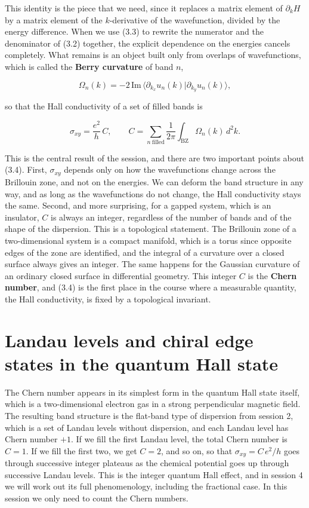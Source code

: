 This identity is the piece that we need, since it replaces a matrix element of $\partial_k H$ by a
matrix element of the $k$-derivative of the wavefunction, divided by the energy difference. When we
use (3.3) to rewrite the numerator and the denominator of (3.2) together, the explicit dependence on
the energies cancels completely. What remains is an object built only from overlaps of wavefunctions,
which is called the \textbf{Berry curvature} of band $n$,

\begin{equation*}
\Omega_n(k) = -2\,\mathrm{Im}\, \langle \partial_{k_x} u_n(k)|\partial_{k_y} u_n(k)\rangle,
\end{equation*}

so that the Hall conductivity of a set of filled bands is

\begin{equation}
\sigma_{xy} = \frac{e^2}{h}\, C, \qquad
C = \sum_{n\ \text{filled}} \frac{1}{2\pi}\int_{\text{BZ}} \Omega_n(k)\, d^2k.
\end{equation}

This is the central result of the session, and there are two important points about (3.4). First,
$\sigma_{xy}$ depends only on how the wavefunctions change across the Brillouin zone, and not on the
energies. We can deform the band structure in any way, and as long as the wavefunctions do not
change, the Hall conductivity stays the same. Second, and more surprising, for a gapped system, which
is an insulator, $C$ is always an integer, regardless of the number of bands and of the shape of the
dispersion. This is a topological statement. The Brillouin zone of a two-dimensional system is a
compact manifold, which is a torus since opposite edges of the zone are identified, and the integral
of a curvature over a closed surface always gives an integer. The same happens for the Gaussian
curvature of an ordinary closed surface in differential geometry. This integer $C$ is the
\textbf{Chern number}, and (3.4) is the first place in the course where a measurable quantity, the
Hall conductivity, is fixed by a topological invariant.

\section{Landau levels and chiral edge states in the quantum Hall state}

The Chern number appears in its simplest form in the quantum Hall state itself, which is a
two-dimensional electron gas in a strong perpendicular magnetic field. The resulting band structure is
the flat-band type of dispersion from session 2, which is a set of Landau levels without dispersion,
and each Landau level has Chern number $+1$. If we fill the first Landau level, the total Chern
number is $C=1$. If we fill the first two, we get $C=2$, and so on, so that $\sigma_{xy} = C\, e^2/h$
goes through successive integer plateaus as the chemical potential goes up through successive Landau
levels. This is the integer quantum Hall effect, and in session 4 we will work out its full
phenomenology, including the fractional case. In this session we only need to count the Chern
numbers.

